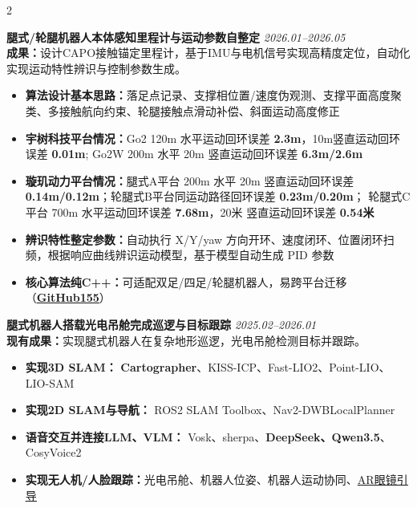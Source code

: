 \documentclass[10pt,A4]{article}
\begin{document}
\begin{paracol}{2}
\begin{rightcolumn}
\noindent
\large\textbf{腿式/轮腿机器人本体感知里程计与运动参数自整定} \normalsize \hfill \textit{2026.01--2026.05}\\[4pt]
\textbf{成果：}设计CAPO接触锚定里程计，基于IMU与电机信号实现高精度定位，自动化实现运动特性辨识与控制参数生成。\\[-4pt]
\begin{itemize}
    \item \textbf{算法设计基本思路：}落足点记录、支撑相位置/速度伪观测、支撑平面高度聚类、多接触航向约束、轮腿接触点滑动补偿、斜面运动高度修正
    \item \textbf{宇树科技平台情况：}Go2 120m 水平运动回环误差 \textbf{2.3m}，10m竖直运动回环误差 \textbf{0.01m}; Go2W 200m 水平 20m 竖直运动回环误差 \textbf{6.3m/2.6m}
    \item \textbf{璇玑动力平台情况：}腿式A平台 200m 水平 20m 竖直运动回环误差 \textbf{0.14m/0.12m}；轮腿式B平台同运动路径回环误差 \textbf{0.23m/0.20m}； 轮腿式C平台 700m 水平运动回环误差 \textbf{7.68m}，20米 竖直运动回环误差 \textbf{0.54米}
    \item \textbf{辨识特性整定参数：}自动执行 X/Y/yaw 方向开环、速度闭环、位置闭环扫频，根据响应曲线辨识运动模型，基于模型自动生成 PID 参数
    \item \textbf{核心算法纯C++：}可适配双足/四足/轮腿机器人，易跨平台迁移（\href{https://github.com/ShineMinxing/CAPO-LeggedRobotOdometry}{\textbf{\underline{GitHub\faStar{}155}}}\;\raisebox{-0.1ex}{\faExternalLink}）
\end{itemize}

\vspace{1.2em}

\noindent
\large\textbf{腿式机器人搭载光电吊舱完成巡逻与目标跟踪} \normalsize \hfill \textit{2025.02--2026.01}\\[4pt]
\textbf{现有成果：}实现腿式机器人在复杂地形巡逻，光电吊舱检测目标并跟踪。\\[-4pt]
\begin{itemize}
    \item \textbf{实现3D SLAM：} \textbf{Cartographer}、KISS-ICP、Fast-LIO2、Point-LIO、LIO-SAM
	\item \textbf{实现2D SLAM与导航：}  ROS2 SLAM Toolbox、Nav2-DWBLocalPlanner
    \item \textbf{语音交互并连接LLM、VLM：} Vosk、sherpa、\textbf{DeepSeek、Qwen3.5}、CosyVoice2
    \item \textbf{实现无人机/人脸跟踪：}光电吊舱、机器人位姿、机器人运动协同、\href{https://www.bilibili.com/video/BV1rFJHzhEE9}{\underline{AR眼镜引导}}\;\raisebox{-0.1ex}{\faExternalLink}
\end{itemize}


\end{rightcolumn}
\end{paracol}
\end{document}
